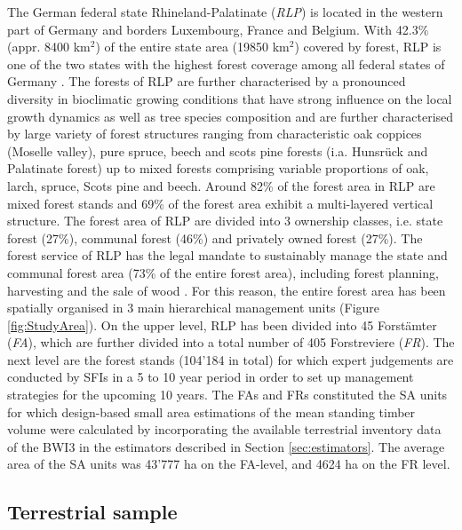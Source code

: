 The German federal state Rhineland-Palatinate (\textit{RLP}) is located in the western part of Germany and borders Luxembourg, France and Belgium. With 42.3\% (appr. 8400 km$^2$) of the entire state area (19850 km$^2$) covered by forest, RLP is one of the two states with the highest forest coverage among all federal states of Germany \citep{bwi3}. The forests of RLP are further characterised by a pronounced diversity in bioclimatic growing conditions that have strong influence on the local growth dynamics as well as tree species composition \citep{gauer2005} and are further characterised by large variety of forest structures ranging from characteristic oak coppices (Moselle valley), pure spruce, beech and scots pine forests (i.a. Hunsr{\"u}ck and Palatinate forest) up to mixed forests comprising variable proportions of oak, larch, spruce, Scots pine and beech. Around 82\% of the forest area in RLP are mixed forest stands and 69\% of the forest area exhibit a multi-layered vertical structure. The forest area of RLP are divided into 3 ownership classes, i.e. state forest (27\%), communal forest (46\%) and privately owned forest (27\%). The forest service of RLP has the legal mandate to sustainably manage the state and communal forest area (73\% of the entire forest area), including forest planning, harvesting and the sale of wood \citep{lwaldg_rlp}. For this reason, the entire forest area has been spatially organised in 3 main hierarchical management units (Figure \ref{fig:StudyArea}). On the upper level, RLP has been divided into 45 Forst{\"a}mter (\textit{FA}), which are further divided into a total number of 405 Forstreviere (\textit{FR}). The next level are the forest stands (104'184 in total) for which expert judgements are conducted by SFIs in a 5 to 10 year period in order to set up management strategies for the upcoming 10 years. The FAs and FRs constituted the SA units for which design-based small area estimations of the mean standing timber volume were calculated by incorporating the available terrestrial inventory data of the BWI3 in the estimators described in Section \ref{sec:estimators}. The average area of the SA units was 43'777 ha on the FA-level, and 4624 ha on the FR level.


\subsection{Terrestrial sample}

